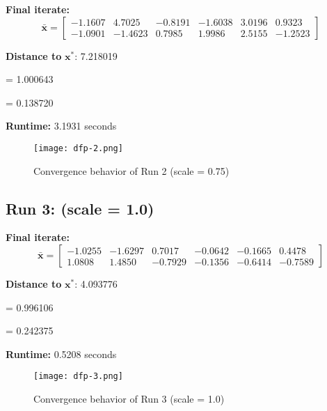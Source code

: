 \documentclass{article}
\begin{document}
\textbf{Final iterate:}
\[
\bar{\mathbf{x}} =
\begin{bmatrix}
-1.1607 & 4.7025 & -0.8191 & -1.6038 & 3.0196 & 0.9323 \\
-1.0901 & -1.4623 & 0.7985 & 1.9986 & 2.5155 & -1.2523
\end{bmatrix}
\]

\vspace{0.5em}
\noindent
\textbf{Distance to } $\mathbf{x}^*$: 7.218019

\vspace{0.5em}
\noindent
{} = 1.000643

\noindent
{} = 0.138720

\vspace{0.5em}
\noindent
\textbf{Runtime:} 3.1931 seconds

\begin{figure}[H]
    \centering
    \texttt{[image: dfp-2.png]}
    \caption{Convergence behavior of Run 2 (scale = 0.75)}
    \label{fig:dfp-run2}
\end{figure}


\subsection*{Run 3: (scale = 1.0)}
\vspace{1em}

\textbf{Final iterate:}
\[
\bar{\mathbf{x}} =
\begin{bmatrix}
-1.0255 & -1.6297 & 0.7017 & -0.0642 & -0.1665 & 0.4478 \\
1.0808 & 1.4850 & -0.7929 & -0.1356 & -0.6414 & -0.7589
\end{bmatrix}
\]

\vspace{0.5em}
\noindent
\textbf{Distance to } $\mathbf{x}^*$: 4.093776

\vspace{0.5em}
\noindent
{} = 0.996106

\noindent
{} = 0.242375

\vspace{0.5em}
\noindent
\textbf{Runtime:} 0.5208 seconds

\begin{figure}[H]
    \centering
    \texttt{[image: dfp-3.png]}
    \caption{Convergence behavior of Run 3 (scale = 1.0)}
    \label{fig:dfp-run3}
\end{figure}
\end{document}
